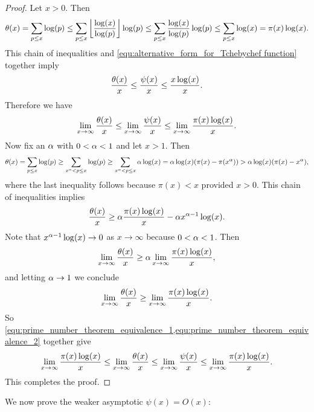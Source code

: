       \begin{proof}
        Let $x > 0$. Then
        \[
          \theta(x) = \sum_{p \le x}\log(p) \le \sum_{p \le x}\left\lfloor\frac{\log(x)}{\log(p)}\right\rfloor\log(p) \le \sum_{p \le x}\frac{\log(x)}{\log(p)}\log(p) \le \sum_{p \le x}\log(x) = \pi(x)\log(x).
        \]
        This chain of inequalities and \cref{equ:alternative_form_for_Tchebychef function} together imply
        \[
          \frac{\theta(x)}{x} \le \frac{\psi(x)}{x} \le \frac{x\log(x)}{x}.
        \]
        Therefore we have
        \begin{equation}\label{equ:prime_number_theorem_equivalence_1}
          \lim_{x \to \infty}\frac{\theta(x)}{x} \le \lim_{x \to \infty}\frac{\psi(x)}{x} \le \lim_{x \to \infty}\frac{\pi(x)\log(x)}{x}.
        \end{equation}
        Now fix an $\alpha$ with $0 < \alpha < 1$ and let $x > 1$. Then
        \[
          \theta(x) = \sum_{p \le x}\log(p) \ge \sum_{x^{\alpha} < p \le x}\log(p) \ge \sum_{x^{\alpha} < p \le x}\alpha\log(x) = \alpha\log(x)(\pi(x)-\pi(x^{\alpha})) > \alpha\log(x)(\pi(x)-x^{\alpha}),
        \]
        where the last inequality follows because $\pi(x) < x$ provided $x > 0$. This chain of inequalities implies
        \[
          \frac{\theta(x)}{x} \ge \alpha\frac{\pi(x)\log(x)}{x}-\alpha x^{\alpha-1}\log(x).
        \]
        Note that $x^{\alpha-1}\log(x) \to 0$ as $x \to \infty$ because $0 < \alpha < 1$. Then
        \[
          \lim_{x \to \infty}\frac{\theta(x)}{x} \ge \alpha\lim_{x \to \infty}\frac{\pi(x)\log(x)}{x},
        \]
        and letting $\alpha \to 1$ we conclude
        \begin{equation}\label{equ:prime_number_theorem_equivalence_2}
          \lim_{x \to \infty}\frac{\theta(x)}{x} \ge \lim_{x \to \infty}\frac{\pi(x)\log(x)}{x}.
        \end{equation}
        So \cref{equ:prime_number_theorem_equivalence_1,equ:prime_number_theorem_equivalence_2} together give
        \[
          \lim_{x \to \infty}\frac{\pi(x)\log(x)}{x} \le \lim_{x \to \infty}\frac{\theta(x)}{x} \le \lim_{x \to \infty}\frac{\psi(x)}{x} \le \lim_{x \to \infty}\frac{\pi(x)\log(x)}{x}.
        \]
        This completes the proof.
      \end{proof}

      We now prove the weaker asymptotic $\psi(x) = O(x)$:

